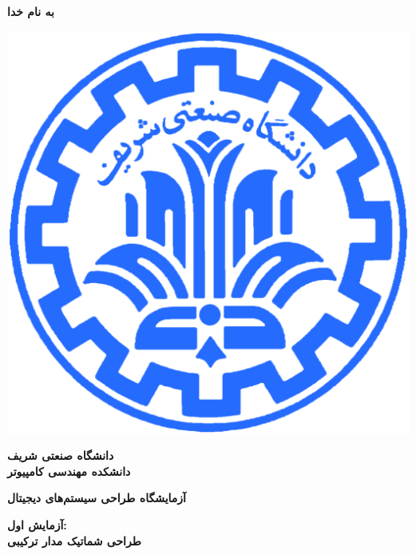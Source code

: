\documentclass[12pt,onecolumn,a4paper,fleqn]{article}
\begin{document}
	\large
	\begin{titlepage}
		
		\begin{center}
			\begin{huge}
				\textbf{
					به نام خدا\\
				}
			\end{huge}
			
			\vspace*{1.5cm}
			\includegraphics[scale=0.9]{source/sharif1.png}\\
			\vspace*{0.5cm}
			\begin{Large}
				\textbf{
					دانشگاه صنعتی شریف\\
					\vspace*{0.25cm}
					دانشکده مهندسی کامپیوتر\\
				}
			\end{Large}
			\vspace*{3cm}
			\begin{huge}
				\textbf{
					آزمایشگاه طراحی سیستم‌های دیجیتال\\
					\vspace*{1.75cm}
				}
			\end{huge}
			
			\begin{Large}
				\textbf{
					آزمایش اول:\\
					طراحی شماتیک مدار ترکیبی\\
				}
			\end{Large}
			

\end{center}
\end{titlepage}
\end{document}
